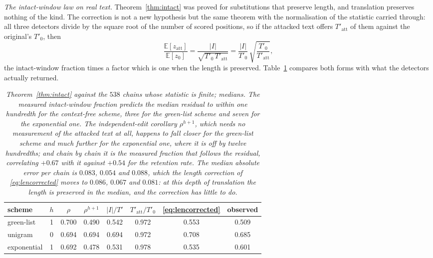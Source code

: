 \documentclass[11pt,a4paper]{article}
\theoremstyle{plain}
\theoremstyle{definition}
\numberwithin{equation}{section}
\begin{document}
\medskip
\noindent\emph{The intact-window law on real text.}
Theorem~\ref{thm:intact} was proved for substitutions that preserve
length, and translation preserves nothing of the kind. The correction is
not a new hypothesis but the same theorem with the normalisation of the
statistic carried through: all three detectors divide by the square root
of the number of scored positions, so if the attacked text offers
$T'_{\mathrm{att}}$ of them against the original's $T'_0$, then
\begin{equation}\label{eq:lencorrected}
\frac{\mathbb{E}[z_{\mathrm{att}}]}{\mathbb{E}[z_0]}
= \frac{|I|}{\sqrt{T'_0\,T'_{\mathrm{att}}}}
= \frac{|I|}{T'_0}\,\sqrt{\frac{T'_0}{T'_{\mathrm{att}}}},
\end{equation}
the intact-window fraction times a factor which is one when the length
is preserved. Table~\ref{tab:thmc} compares both forms with what the
detectors actually returned.

\begin{table}[t]
\centering
\small
\begin{tabular}{lccccccc}
\toprule
scheme & $h$ & $\rho$ & $\rho^{h+1}$ & $|I|/T'$ &
$T'_{\mathrm{att}}/T'_0$ & \eqref{eq:lencorrected} & observed\\
\midrule
green-list  & 1 & 0.700 & 0.490 & 0.542 & 0.972 & 0.553 & 0.509\\
unigram     & 0 & 0.694 & 0.694 & 0.694 & 0.972 & 0.708 & 0.685\\
exponential & 1 & 0.692 & 0.478 & 0.531 & 0.978 & 0.535 & 0.601\\
\bottomrule
\end{tabular}
\caption{\emph{Theorem~\ref{thm:intact} against the $538$ chains whose
statistic is finite; medians. The measured intact-window fraction
predicts the median residual to within one hundredth for the
context-free scheme, three for the green-list scheme and seven for the
exponential one. The independent-edit corollary $\rho^{h+1}$, which
needs no measurement of the attacked text at all, happens to fall closer
for the green-list scheme and much further for the exponential one,
where it is off by twelve hundredths; and chain by chain it is the
measured fraction that follows the residual, correlating $+0.67$ with it
against $+0.54$ for the retention rate. The median absolute error per
chain is $0.083$, $0.054$ and $0.088$, which the length correction of
\eqref{eq:lencorrected} moves to $0.086$, $0.067$ and $0.081$: at this
depth of translation the length is preserved in the median, and the
correction has little to do.}}
\label{tab:thmc}
\end{table}
\end{document}

